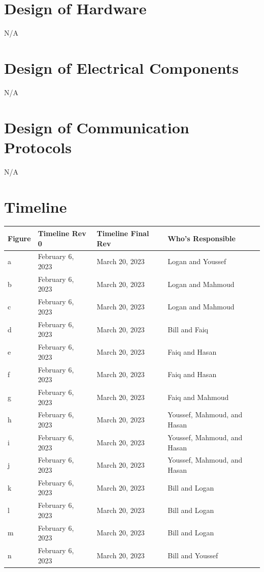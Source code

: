 \documentclass[12pt, titlepage]{article}
\begin{document}
\newpage
\section{Design of Hardware}

N/A

\section{Design of Electrical Components}

N/A

\section{Design of Communication Protocols}

N/A

\section{Timeline}

\begin{table}[H]
	\begin{tabular}{|l|l|l|l|}
		\hline
		Figure & Timeline Rev 0   & Timeline Final Rev & Who's Responsible           \\ \hline
		a      & February 6, 2023 & March 20, 2023     & Logan and Youssef           \\ \hline
		b      & February 6, 2023 & March 20, 2023     & Logan and Mahmoud           \\ \hline
		c      & February 6, 2023 & March 20, 2023     & Logan and Mahmoud           \\ \hline
		d      & February 6, 2023 & March 20, 2023     & Bill and Faiq               \\ \hline
		e      & February 6, 2023 & March 20, 2023     & Faiq and Hasan              \\ \hline
		f      & February 6, 2023 & March 20, 2023     & Faiq and Hasan              \\ \hline
		g      & February 6, 2023 & March 20, 2023     & Faiq and Mahmoud            \\ \hline
		h      & February 6, 2023 & March 20, 2023     & Youssef, Mahmoud, and Hasan \\ \hline
		i      & February 6, 2023 & March 20, 2023     & Youssef, Mahmoud, and Hasan \\ \hline
		j      & February 6, 2023 & March 20, 2023     & Youssef, Mahmoud, and Hasan \\ \hline
		k      & February 6, 2023 & March 20, 2023     & Bill and Logan              \\ \hline
		l      & February 6, 2023 & March 20, 2023     & Bill and Logan              \\ \hline
		m      & February 6, 2023 & March 20, 2023     & Bill and Logan              \\ \hline
		n      & February 6, 2023 & March 20, 2023     & Bill and Youssef            \\ \hline
	\end{tabular}
\end{table}
\end{document}
